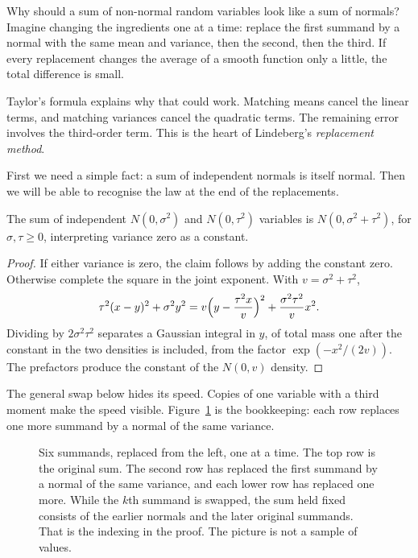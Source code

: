 Why should a sum of non-normal random variables look like a sum of normals? Imagine changing the ingredients one at a time: replace the first summand by a normal with the same mean and variance, then the second, then the third. If every replacement changes the average of a smooth function only a little, the total difference is small.

Taylor's formula explains why that could work. Matching means cancel the linear terms, and matching variances cancel the quadratic terms. The remaining error involves the third-order term. This is the heart of Lindeberg's \emph{replacement method}.

First we need a simple fact: a sum of independent normals is itself normal. Then we will be able to recognise the law at the end of the replacements.

\begin{lemma}\label{lem:normalsum}
The sum of independent $N(0,\sigma^2)$ and $N(0,\tau^2)$ variables is $N(0,\sigma^2+\tau^2)$, for $\sigma,\tau\ge0$, interpreting variance zero as a constant.
\end{lemma}
\begin{proof}
If either variance is zero, the claim follows by adding the constant zero. Otherwise complete the square in the joint exponent. With $v=\sigma^2+\tau^2$,
\[
\tau^2(x-y)^2+\sigma^2 y^2
=v\Bigl(y-\frac{\tau^2 x}{v}\Bigr)^2+\frac{\sigma^2\tau^2}{v}x^2.
\]
Dividing by $2\sigma^2\tau^2$ separates a Gaussian integral in $y$, of total mass one after the constant in the two densities is included, from the factor $\exp(-x^2/(2v))$. The prefactors produce the constant of the $N(0,v)$ density.
\end{proof}

The general swap below hides its speed. Copies of one variable with a third moment make the speed visible. Figure~\ref{fig:lindeberg} is the bookkeeping: each row replaces one more summand by a normal of the same variance.

\begin{figure}[ht]
\centering
{}
\caption{Six summands, replaced from the left, one at a time. The top row is the original sum. The second row has replaced the first summand by a normal of the same variance, and each lower row has replaced one more. While the $k$th summand is swapped, the sum held fixed consists of the earlier normals and the later original summands. That is the indexing in the proof. The picture is not a sample of values.}
\label{fig:lindeberg}
\end{figure}

